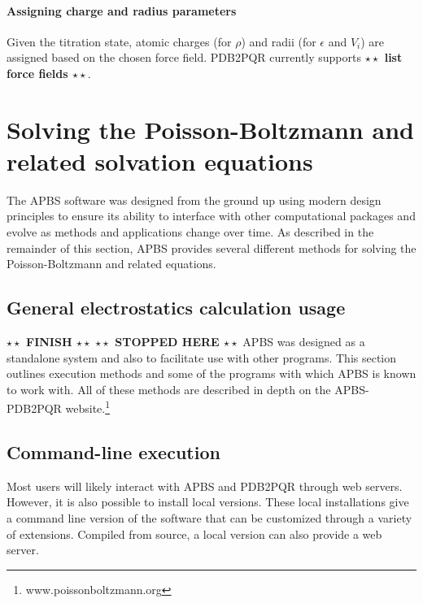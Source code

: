\documentclass[11pt,titlepage]{article}
\newcommand{\todo}[1]{\textbf{$\star \star$ {#1} $\star \star$}}
\begin{document}
\paragraph{Assigning charge and radius parameters}
Given the titration state, atomic charges (for $\rho$) and radii (for $\epsilon$ and $V_i$) are assigned based on the chosen force field.
PDB2PQR currently supports \todo{list force fields}.

\section{Solving the Poisson-Boltzmann and related solvation equations}

The APBS software was designed from the ground up using modern design principles to ensure its ability to interface with other computational packages and evolve as methods and applications change over time.
As described in the remainder of this section, APBS provides several different methods for solving the Poisson-Boltzmann and related equations.

\subsection{General electrostatics calculation usage}
\todo{FINISH} \todo{STOPPED HERE}
APBS was designed as a standalone system and also to facilitate use with other programs. This section outlines execution methods and some of the programs with which APBS is known to work with. All of these methods are described in depth on the APBS-PDB2PQR website.\footnote{www.poissonboltzmann.org}

\subsection{Command-line execution}
Most users will likely interact with APBS and PDB2PQR through web servers. However, it is also possible to install local versions. These local installations give a command line version of the  software that can be customized through a variety of extensions. Compiled from source, a local version can also provide a web server.
\end{document}
